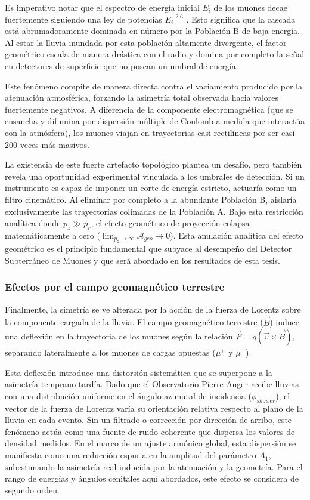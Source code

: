 Es imperativo notar que el espectro de energía inicial $E_i$ de los muones decae fuertemente siguiendo una ley de potencias $E_i^{-2.6}$ \cite{Cazon2012}. Esto significa que la cascada está abrumadoramente dominada en número por la Población B de baja energía. Al estar la lluvia inundada por esta población altamente divergente, el factor geométrico escala de manera drástica con el radio y domina por completo la señal en detectores de superficie que no posean un umbral de energía.

Este fenómeno compite de manera directa contra el vaciamiento producido por la atenuación atmosférica, forzando la asimetría total observada hacia valores fuertemente negativos. A diferencia de la componente electromagnética (que se ensancha y difumina por dispersión múltiple de Coulomb a medida que interactúa con la atmósfera), los muones viajan en trayectorias casi rectilíneas por ser casi 200 veces más masivos.

La existencia de este fuerte artefacto topológico plantea un desafío, pero también revela una oportunidad experimental vinculada a los umbrales de detección. Si un instrumento es capaz de imponer un corte de energía estricto, actuaría como un filtro cinemático. Al eliminar por completo a la abundante Población B, aislaría exclusivamente las trayectorias colimadas de la Población A. Bajo esta restricción analítica donde $p_z \gg p_r$, el efecto geométrico de proyección colapsa matemáticamente a cero ($\lim_{p_z \to \infty} \mathcal{A}_{geo} \to 0$). Esta anulación analítica del efecto geométrico es el principio fundamental que subyace al desempeño del Detector Subterráneo de Muones y que será abordado en los resultados de esta tesis.

\subsubsection{Efectos por el campo geomagnético terrestre}
\label{subsubsec:geomagnetico}

Finalmente, la simetría se ve alterada por la acción de la fuerza de Lorentz sobre la componente cargada de la lluvia. El campo geomagnético terrestre ($\vec{B}$) induce una deflexión en la trayectoria de los muones según la relación $\vec{F} = q(\vec{v} \times \vec{B})$, separando lateralmente a los muones de cargas opuestas ($\mu^+$ y $\mu^-$).

Esta deflexión introduce una distorsión sistemática que se superpone a la asimetría temprano-tardía. Dado que el Observatorio Pierre Auger recibe lluvias con una distribución uniforme en el ángulo azimutal de incidencia ($\phi_{shower}$), el vector de la fuerza de Lorentz varía su orientación relativa respecto al plano de la lluvia en cada evento. Sin un filtrado o corrección por dirección de arribo, este fenómeno actúa como una fuente de ruido coherente que dispersa los valores de densidad medidos. En el marco de un ajuste armónico global, esta dispersión se manifiesta como una reducción espuria en la amplitud del parámetro $A_1$, subestimando la asimetría real inducida por la atenuación y la geometría. Para el rango de energías y ángulos cenitales aquí abordados, este efecto se considera de segundo orden.

